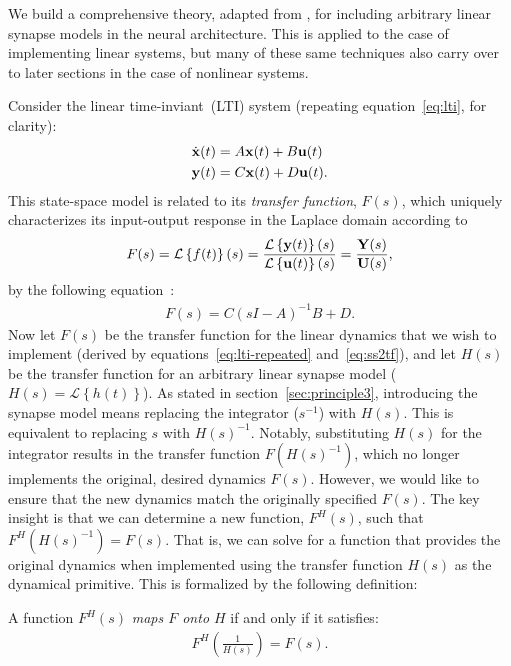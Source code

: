 We build a comprehensive theory, adapted from \citet{voelker2018}, for including arbitrary linear synapse models in the neural architecture.
This is applied to the case of implementing linear systems, but many of these same techniques also carry over to later sections in the case of nonlinear systems. %

Consider the linear time-inviant~(LTI) system (repeating equation~\ref{eq:lti}, for clarity):
\begin{equation} \label{eq:lti-repeated}
\begin{split}
\dot{\mathbf{x}}(t) &= A\mathbf{x}(t) + B\mathbf{u}(t) \\
\mathbf{y}(t) &= C\mathbf{x}(t) + D\mathbf{u}(t) \text{.}
\end{split}
\end{equation}
This state-space model is related to its \emph{transfer function}, $F(s)$, which uniquely characterizes its input-output response in the Laplace domain according to
$$
F(s) = \mathcal{L}\left\{{f(t)}\right\}(s) = \frac{\mathcal{L}\left\{{\mathbf{y}(t)}\right\}(s)}{\mathcal{L}\left\{{\mathbf{u}(t)}\right\}(s)} = \frac{\mathbf{Y}(s)}{\mathbf{U}(s)} \text{,}
$$
by the following equation~\citep{brogan1982modern}:
\begin{align} \label{eq:ss2tf}
F(s) = C(sI - A)^{-1}B + D \text{.}
\end{align}
Now let $F(s)$ be the transfer function for the linear dynamics that we wish to implement (derived by equations~\ref{eq:lti-repeated} and~\ref{eq:ss2tf}), and let $H(s)$ be the transfer function for an arbitrary linear synapse model ($H(s) = \mathcal{L} \left\{ h(t) \right\}$).
As stated in section~\ref{sec:principle3}, introducing the synapse model means replacing the integrator ($s^{-1}$) with $H(s)$.
This is equivalent to replacing $s$ with $H(s)^{-1}$.
Notably, substituting $H(s)$ for the integrator results in the transfer function $F \left( H(s)^{-1} \right)$, which no longer implements the original, desired dynamics $F(s)$. %
However, we would like to ensure that the new dynamics match the originally specified $F(s)$.
The key insight is that we can determine a new function, $F^H(s)$, such that $F^{H}\left( H(s)^{-1} \right) = F(s)$.
That is, we can solve for a function that provides the original dynamics when implemented using the transfer function $H(s)$ as the dynamical primitive.
This is formalized by the following definition:
\begin{definition} \label{def:maps-onto}
A function $F^{H}(s)$ \emph{maps $F$ onto $H$} if and only if it satisfies:
\begin{align} \label{eq:maps-onto}
F^{H}\left( \frac{1}{H(s)} \right) = F(s) \text{.}
\end{align}
\end{definition}

